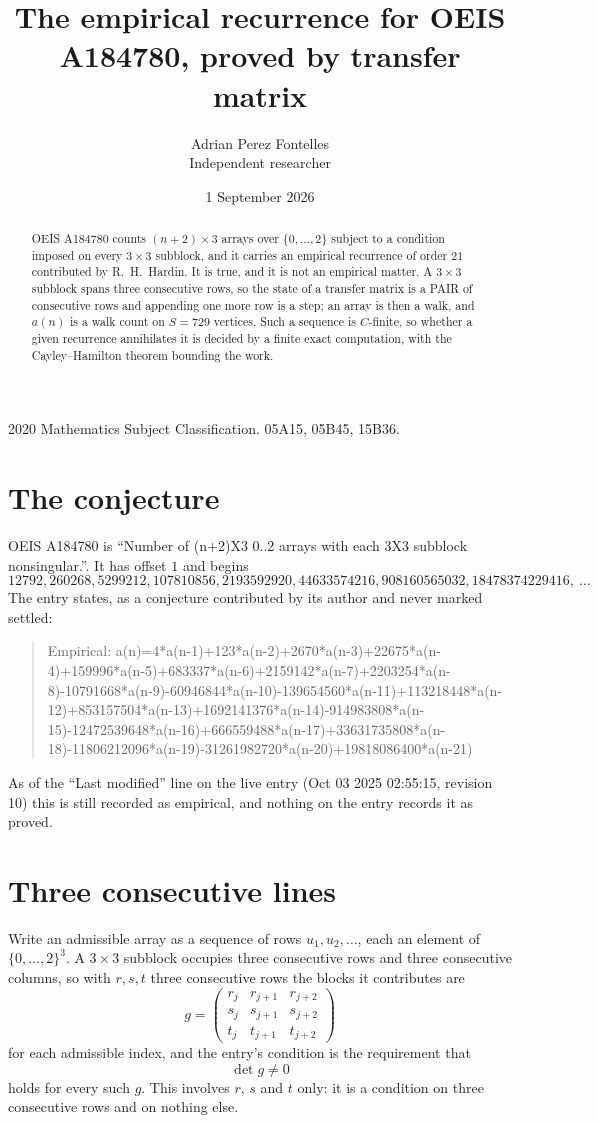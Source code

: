 \documentclass[11pt,a4paper]{article}
\title{The empirical recurrence for OEIS A184780, proved by transfer matrix}
\author{Adrian Perez Fontelles\\ \small Independent researcher}
\date{1 September 2026}
\theoremstyle{plain}
\theoremstyle{definition}
\begin{document}
\maketitle

\begin{abstract}
OEIS A184780 counts $(n+2)\times3$ arrays over $\{0,\dots,2\}$ subject to a condition imposed on
every $3\times3$ subblock, and it carries an empirical recurrence of order $21$
contributed by R.~H.~Hardin. It is true, and it is not an empirical matter. A $3\times3$
subblock spans three consecutive rows, so the state of a transfer matrix is a PAIR of
consecutive rows and appending one more row is a step; an array is then a walk, and
$a(n)$ is a walk count on $S=729$ vertices. Such a sequence is $C$-finite, so whether a given
recurrence annihilates it is decided by a finite exact computation, with the Cayley--Hamilton
theorem bounding the work.
\end{abstract}

\noindent\small 2020 Mathematics Subject Classification. 05A15, 05B45, 15B36.\normalsize

\section{The conjecture}

OEIS A184780 is ``Number of (n+2)X3 0..2 arrays with each 3X3 subblock nonsingular.''. It has offset $1$ and begins
\[
12792, 260268, 5299212, 107810856, 2193592920, 44633574216, 908160565032, 18478374229416,\ \dots
\]
The entry states, as a conjecture contributed by its author and never marked settled:
\begin{quote}
Empirical: a(n)=4*a(n-1)+123*a(n-2)+2670*a(n-3)+22675*a(n-4)+159996*a(n-5)+683337*a(n-6)+2159142*a(n-7)+2203254*a(n-8)-10791668*a(n-9)-60946844*a(n-10)-139654560*a(n-11)+113218448*a(n-12)+853157504*a(n-13)+1692141376*a(n-14)-914983808*a(n-15)-12472539648*a(n-16)+666559488*a(n-17)+33631735808*a(n-18)-11806212096*a(n-19)-31261982720*a(n-20)+19818086400*a(n-21)
\end{quote}
As of the ``Last modified'' line on the live entry (Oct 03 2025 02:55:15, revision 10) this is still
recorded as empirical, and nothing on the entry records it as proved.

\section{Three consecutive lines}

Write an admissible array as a sequence of rows $u_1,u_2,\dots$, each an element of
$\{0,\dots,2\}^{3}$. A $3\times3$ subblock occupies three consecutive rows and
three consecutive columns, so with $r,s,t$ three consecutive rows the blocks it
contributes are
\[
g=\begin{pmatrix}r_j&r_{j+1}&r_{j+2}\\ s_j&s_{j+1}&s_{j+2}\\ t_j&t_{j+1}&t_{j+2}\end{pmatrix}
\]
for each admissible index, and the entry's condition is the requirement that
\[
\det g \ne 0
\]
holds for every such $g$. This involves $r$, $s$ and $t$ only: it is a condition on
three consecutive rows and on nothing else.
\end{document}
